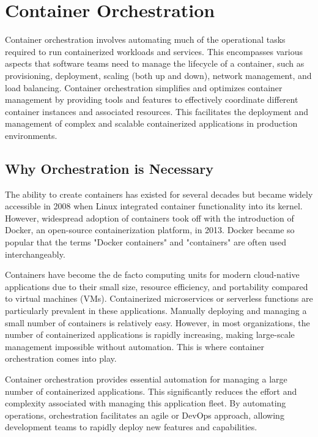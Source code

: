 \section{Container Orchestration}

Container orchestration involves automating much of the operational tasks required to run containerized workloads and services. This encompasses various aspects that software teams need to manage the lifecycle of a container, such as provisioning, deployment, scaling (both up and down), network management, and load balancing. Container orchestration simplifies and optimizes container management by providing tools and features to effectively coordinate different container instances and associated resources. This facilitates the deployment and management of complex and scalable containerized applications in production environments.

\subsection{Why Orchestration is Necessary}

The ability to create containers has existed for several decades but became widely accessible in 2008 when Linux integrated container functionality into its kernel. However, widespread adoption of containers took off with the introduction of Docker, an open-source containerization platform, in 2013. Docker became so popular that the terms "Docker containers" and "containers" are often used interchangeably.

Containers have become the de facto computing units for modern cloud-native applications due to their small size, resource efficiency, and portability compared to virtual machines (VMs). Containerized microservices or serverless functions are particularly prevalent in these applications. Manually deploying and managing a small number of containers is relatively easy. However, in most organizations, the number of containerized applications is rapidly increasing, making large-scale management impossible without automation. This is where container orchestration comes into play.

Container orchestration provides essential automation for managing a large number of containerized applications. This significantly reduces the effort and complexity associated with managing this application fleet. By automating operations, orchestration facilitates an agile or DevOps approach, allowing development teams to rapidly deploy new features and capabilities.

